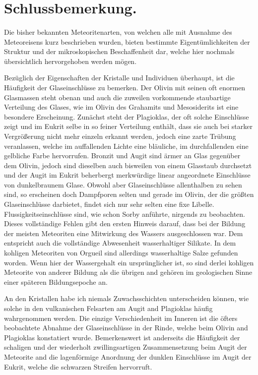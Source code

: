 \documentclass[a4paper, 12pt, oneside]{article}
\begin{document}
\section{Schlussbemerkung.}
\paragraph*{}
Die bisher bekannten Meteoritenarten, von welchen alle mit Ausnahme des Meteoreisens kurz beschrieben wurden, bieten bestimmte Eigentümlichkeiten der Struktur und der mikroskopischen Beschaffenheit dar, welche hier nochmals übersichtlich hervorgehoben werden mögen.

Bezüglich der Eigenschaften der Kristalle und Individuen überhaupt, ist die Häufigkeit der Glaseinschlüsse zu bemerken. Der Olivin mit seinen oft enormen Glasmassen steht obenan und auch die zuweilen vorkommende staubartige Verteilung des Glases, wie im Olivin des Grahamits und Mesosiderits ist eine besondere Erscheinung. Zunächst steht der Plagioklas, der oft solche Einschlüsse zeigt und im Eukrit selbe in so feiner Verteilung enthält, dass sie auch bei starker Vergrößerung nicht mehr einzeln erkannt werden, jedoch eine zarte Trübung veranlassen, welche im auffallenden Lichte eine bläuliche, im durchfallenden eine gelbliche Farbe hervorrufen. Bronzit und Augit sind ärmer an Glas gegenüber dem Olivin, jedoch sind dieselben auch bisweilen von einem Glasstaub durchsetzt und der Augit im Eukrit beherbergt merkwürdige linear angeordnete Einschlüsse von dunkelbraunem Glase. Obwohl aber Glaseinschlüsse allenthalben zu sehen sind, so erscheinen doch Dampfporen selten und gerade im Olivin, der die größten Glaseinschlüsse darbietet, findet sich nur sehr selten eine fixe Libelle. Flussigkeitseinschlüsse sind, wie schon Sorby anführte, nirgends zu beobachten. Dieses vollständige Fehlen gibt den ersten Hinweis darauf, dass bei der Bildung der meisten Meteoriten eine Mitwirkung des Wassers ausgeschlossen war. Dem entspricht auch die vollständige Abwesenheit wasserhaltiger Silikate. In dem kohligen Meteoriten von Orgueil sind allerdings wasserhaltige Salze gefunden worden. Wenn hier der Wassergehalt ein ursprünglicher ist, so sind derlei kohligen Meteorite von anderer Bildung als die übrigen and gehören im geologischen Sinne einer späteren Bildungsepoche an.

An den Kristallen habe ich niemals Zuwachsschichten unterscheiden können, wie solche in den vulkanischen Felsarten am Augit and Plagioklas häufig wahrgenommen werden. Die einzige Verschiedenheit im Inneren ist die öfters beobachtete Abnahme der Glaseinschlüsse in der Rinde, welche beim Olivin and Plagioklas konstatiert wurde. Bemerkenswert ist anderseits die Häufigkeit der schaligen und der wiederholt zwillingsartigen Zusammensetzung beim Augit der Meteorite and die lagenförmige Anordnung der dunklen Einschlüsse im Augit der Eukrit, welche die schwarzen Streifen hervorruft.
\end{document}
